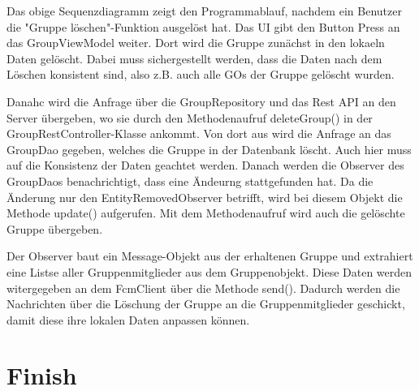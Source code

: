 Das obige Sequenzdiagramm zeigt den Programmablauf, nachdem ein Benutzer die "Gruppe löschen"-Funktion ausgelöst hat. Das UI gibt den Button Press an das GroupViewModel weiter. Dort wird die Gruppe zunächst in den lokaeln Daten gelöscht. Dabei muss sichergestellt werden, dass die Daten nach dem Löschen konsistent sind, also z.B. auch alle GOs der Gruppe gelöscht wurden.

Danahc wird die Anfrage über die GroupRepository und das Rest API an den Server übergeben, wo sie durch den Methodenaufruf deleteGroup() in der GroupRestController-Klasse ankommt. Von dort aus wird die Anfrage an das GroupDao gegeben, welches die Gruppe in der Datenbank löscht. Auch hier muss auf die Konsistenz der Daten geachtet werden. Danach werden die Observer des GroupDaos benachrichtigt, dass eine Ändeurng stattgefunden hat. Da die Änderung nur den EntityRemovedObserver betrifft, wird bei diesem Objekt die Methode update() aufgerufen. Mit dem Methodenaufruf wird auch die gelöschte Gruppe übergeben.

Der Observer baut ein Message-Objekt aus der erhaltenen Gruppe und extrahiert eine Listse aller Gruppenmitglieder aus dem Gruppenobjekt. Diese Daten werden witergegeben an dem FcmClient über die Methode send(). Dadurch werden die Nachrichten über die Löschung der Gruppe an die Gruppenmitglieder geschickt, damit diese ihre lokalen Daten anpassen können.

\section{Finish}{

}
